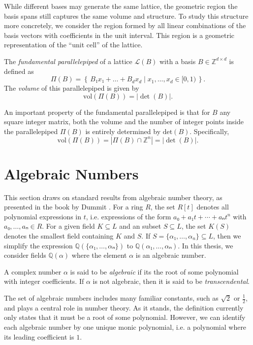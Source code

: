 While different bases may generate the same lattice, the geometric region the
basis spans still captures the same volume and structure.
To study this structure more concretely, we consider the region formed by all
linear combinations of the basis vectors with coefficients in the unit
interval.
This region is a geometric representation of the “unit cell” of the lattice.

\begin{definition}
  The \emph{fundamental parallelepiped} of a lattice $\mathcal{L}(B)$ with a basis $B ∈ ℤ^{d×d}$ is defined as
  \[
    Π(B) = \left\{\, B₁ x₁ + \dots + B_d x_d \mid x_1, \dots, x_d ∈ [0, 1) \,\right\}.
  \]
  The \emph{volume} of this parallelepiped is given by
  \[
    \mathrm{vol}(Π(B)) = |\det(B)|.
  \]
\end{definition}

An important property of the fundamental parallelepiped is that
for $B$ any square integer matrix, both the volume and the number of integer points
inside the parallelepiped $Π(B)$ is entirely determined by $\mathrm{det}(B)$.
Specifically,
\[
  \mathrm{vol}(Π(B)) = |Π(B) ∩ ℤ^n| = |\det(B)|.
\]

\section{Algebraic Numbers}
\label{sec:algebraic}

This section draws on standard results from algebraic number theory, as presented in the book by Dummit \cite{Dummit04}.
For a ring $R$,
the set $R[t]$ denotes all polynomial expressions in $t$,
i.e. expressions of the form $a₀ + a₁ t + ⋯ + aₙ t^n$ with $a₀, …, aₙ ∈ R$.
For a given field $K ⊆ L$ and an subset $S ⊆ L$,
the set $K(S)$ denotes the smallest field containing $K$ and $S$.
If $S = \{α₁, …, α_n\} ⊆ L$, then we simplify the
expression $ℚ(\{α₁, …, αₙ\})$ to $ℚ(α₁, …, αₙ)$.
In this thesis, we consider fields $ℚ(α)$ where the element $α$ is an algebraic number.

\begin{definition}
  A complex number $α$ is said to be \emph{algebraic} if its the root of some polynomial
  with integer coefficients.
  If $α$ is not algebraic, then it is said to be \emph{transcendental}.
\end{definition}

The set of algebraic numbers includes many familiar constants, such as $\sqrt{2}$ or $\frac{1}{2}$,
and plays a central role in number theory.
As it stands, the definition currently only states that it must be a root of some polynomial.
However, we can identify each algebraic number by one unique monic polynomial,
i.e. a polynomial where its leading coefficient is $1$.

